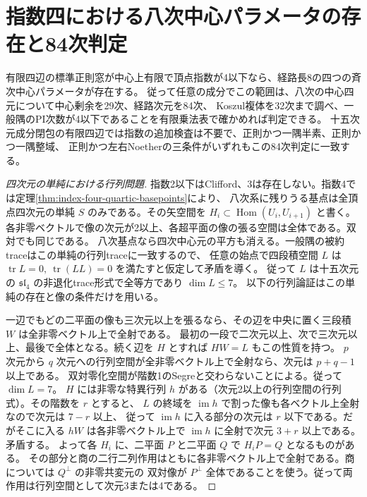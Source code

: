 \section{指数四における八次中心パラメータの存在と84次判定}
\label{sec:index-four-octic-normalization}
\begin{theorem}\label{thm:index-four-octic-normalization}
有限四辺の標準正則窓が中心上有限で頂点指数が4以下なら、経路長8の四つの斉次中心パラメータが存在する。
従って任意の成分でこの範囲は、八次の中心四元について中心剰余を29次、経路次元を84次、
Koszul複体を32次まで調べ、一般隅のPI次数が4以下であることを有限乗法表で確かめれば判定できる。
十五次元成分閉包の有限四辺では指数の追加検査は不要で、正則かつ一隅半素、正則かつ一隅整域、
正則かつ左右Noetherの三条件がいずれもこの84次判定に一致する。
\end{theorem}
\begin{proof}[四次元の単純における行列問題]
指数2以下はClifford、3は存在しない。指数4では定理\ref{thm:index-four-quartic-basepoints}により、
八次系に残りうる基点は全頂点四次元の単純 $S$ のみである。その矢空間を $H_i\subset\operatorname{Hom}(U_i,U_{i+1})$
と書く。各非零ベクトルで像の次元が2以上、各超平面の像の張る空間は全体である。双対でも同じである。
八次基点なら四次中心元の平方も消える。一般隅の被約traceはこの単純の行列traceに一致するので、
任意の始点で四段積空間 $L$ は $\operatorname{tr}L=0,\ \operatorname{tr}(LL)=0$ を満たすと仮定して矛盾を導く。
従って $L$ は十五次元の $\mathfrak{sl}_4$ の非退化trace形式で全等方であり $\dim L\le7$。
以下の行列論証はこの単純の存在と像の条件だけを用いる。

一辺でもどの二平面の像も三次元以上を張るなら、その辺を中央に置く三段積 $W$ は全非零ベクトル上で全射である。
最初の一段で二次元以上、次で三次元以上、最後で全体となる。続く辺を $H$ とすれば $HW=L$ もこの性質を持つ。
$p$ 次元から $q$ 次元への行列空間が全非零ベクトル上で全射なら、次元は $p+q-1$ 以上である。
双対零化空間が階数1のSegreと交わらないことによる。従って $\dim L=7$。
$H$ には非零な特異行列 $h$ がある（次元2以上の行列空間の行列式）。その階数を $r$ とすると、
$L$ の終域を $\operatorname{im} h$ で割った像も各ベクトル上全射なので次元は $7-r$ 以上、
従って $\operatorname{im} h$ に入る部分の次元は $r$ 以下である。だがそこに入る $hW$ は各非零ベクトル上で
$\operatorname{im}h$ に全射で次元 $3+r$ 以上である。矛盾する。
よって各 $H_i$ に、二平面 $P$ と二平面 $Q$ で $H_iP=Q$ となるものがある。
その部分と商の二行二列作用はともに各非零ベクトル上で全射である。商については $Q^\perp$ の非零共変元の
双対像が $P^\perp$ 全体であることを使う。従って両作用は行列空間として次元3または4である。
\end{proof}

